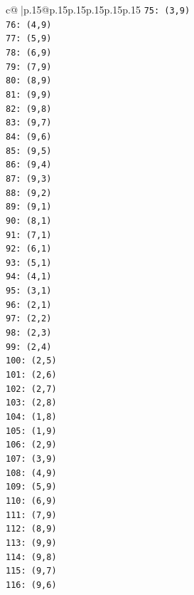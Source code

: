 \documentclass{article}
\begin{document}
{\begin{supertabular}{c@{$\;$}|p{.15\linewidth}@{}p{.15\linewidth}p{.15\linewidth}p{.15\linewidth}p{.15\linewidth}p{.15\linewidth}}
{{{\texttt{75: (3,9)} \\
\texttt{76: (4,9)} \\
\texttt{77: (5,9)} \\
\texttt{78: (6,9)} \\
\texttt{79: (7,9)} \\
\texttt{80: (8,9)} \\
\texttt{81: (9,9)} \\
\texttt{82: (9,8)} \\
\texttt{83: (9,7)} \\
\texttt{84: (9,6)} \\
\texttt{85: (9,5)} \\
\texttt{86: (9,4)} \\
\texttt{87: (9,3)} \\
\texttt{88: (9,2)} \\
\texttt{89: (9,1)} \\
\texttt{90: (8,1)} \\
\texttt{91: (7,1)} \\
\texttt{92: (6,1)} \\
\texttt{93: (5,1)} \\
\texttt{94: (4,1)} \\
\texttt{95: (3,1)} \\
\texttt{96: (2,1)} \\
\texttt{97: (2,2)} \\
\texttt{98: (2,3)} \\
\texttt{99: (2,4)} \\
\texttt{100: (2,5)} \\
\texttt{101: (2,6)} \\
\texttt{102: (2,7)} \\
\texttt{103: (2,8)} \\
\texttt{104: (1,8)} \\
\texttt{105: (1,9)} \\
\texttt{106: (2,9)} \\
\texttt{107: (3,9)} \\
\texttt{108: (4,9)} \\
\texttt{109: (5,9)} \\
\texttt{110: (6,9)} \\
\texttt{111: (7,9)} \\
\texttt{112: (8,9)} \\
\texttt{113: (9,9)} \\
\texttt{114: (9,8)} \\
\texttt{115: (9,7)} \\
\texttt{116: (9,6)} \\
}}}
\end{supertabular}}
\end{document}
